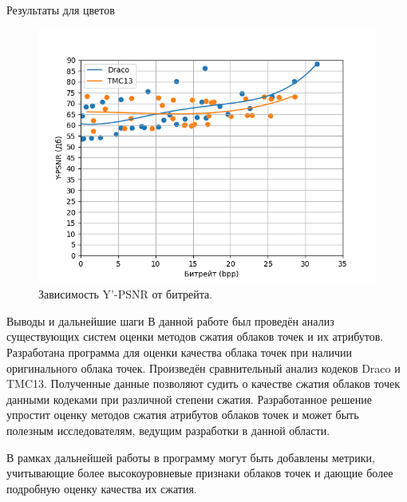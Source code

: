 \documentclass[aspectratio=169]{beamer}
\begin{document}
  \begin{frame}{Результаты для цветов}
    \begin{figure}[H]
        \centering
        \includegraphics[width=0.49\linewidth]{assets/approx_y_psnr.png}
        \caption{ Зависимость Y'-PSNR от битрейта. }
        \label{img:pcc_arena_y_psnr}
    \end{figure}
  \end{frame}

  \begin{frame}{Выводы и дальнейшие шаги}
    В данной работе был проведён анализ существующих систем оценки методов сжатия
    облаков точек и их атрибутов. Разработана программа для оценки качества облака
    точек при наличии оригинального облака точек. Произведён сравнительный анализ
    кодеков Draco и TMC13. Полученные данные позволяют судить о качестве сжатия
    облаков точек данными кодеками при различной степени сжатия. Разработанное
    решение упростит оценку методов сжатия атрибутов облаков точек и может быть
    полезным исследователям, ведущим разработки в данной области.

    В рамках дальнейшей работы в программу могут быть добавлены метрики, учитывающие
    более высокоуровневые признаки облаков точек и дающие более подробную оценку
    качества их сжатия.
  \end{frame}
\end{document}
